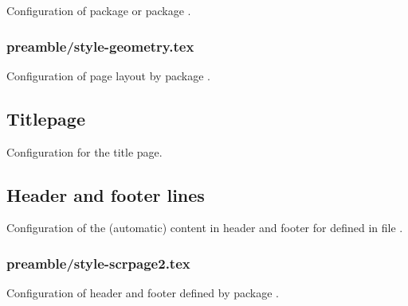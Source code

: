 Configuration of package  or package .


\subsubsection{preamble/style-geometry.tex}

Configuration of page layout by package . 




\subsection{Titlepage}
\label{sec:style:titlepage}
Configuration for the title page.


\subsection{Header and footer lines}
\label{sec:style:headfoot}

Configuration of the (automatic) content in header and footer for  defined in file .


\subsubsection{preamble/style-scrpage2.tex}

Configuration of header and footer defined by package . 


